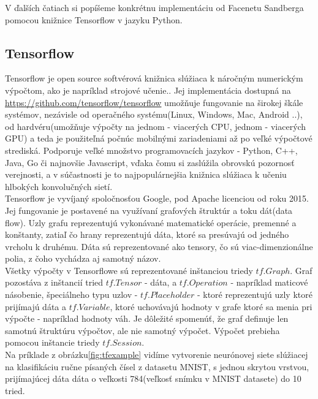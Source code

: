 \indent V ďalších čatiach si popíšeme konkrétnu implementáciu od Facenetu Sandberga \cite{davidsan26} pomocou knižnice Tensorflow v jazyku Python.

\subsection{Tensorflow}
Tensorflow je open source softvérová knižnica slúžiaca k náročným numerickým výpočtom, ako je napríklad strojové učenie.\cite{tensorflow2015}.
Jej implementácia dostupná na \url{https://github.com/tensorflow/tensorflow} umožňuje fungovanie na širokej škále systémov, nezávisle od operačného systému(Linux, Windows, Mac, Android ..), od hardvéru(umožňuje výpočty na jednom - viacerých CPU, jednom - viacerých GPU) a teda je použiteľná počnúc mobilnými zariadeniami až po veľké výpočtové strediská.
Podporuje veľké množstvo programovacích jazykov - Python, C++, Java, Go či najnovšie Javascript, vďaka čomu si zaslúžila obrovskú pozornosť verejnosti, a v súčastnosti je to najpopulárnejšia knižnica slúžiaca k učeniu hlbokých konvolučných sietí.\\

\indent Tensorflow je vyvíjaný spoločnosťou Google, pod Apache licenciou od roku 2015\cite{tensorflow2015}.
Jej fungovanie je postavené na využívaní grafových štruktúr a toku dát(data flow).
Uzly grafu reprezentujú vykonávané matematické operácie, premenné a konštanty, zatiaľ čo hrany reprezentujú dáta, ktoré sa presúvajú od jedného vrcholu k druhému.
Dáta sú reprezentované ako tensory, čo sú viac-dimenzionálne polia, z čoho vychádza aj samotný názov. \\

\indent Všetky výpočty v Tensorflowe sú reprezentované inštanciou triedy $ tf.Graph $. \cite{TensorFl6}
Graf pozostáva z inštancií tried $ tf.Tensor $ - dáta, a $ tf.Operation $ - napríklad maticové násobenie, špeciálneho typu uzlov - $ tf.Placeholder $ - ktoré reprezentujú uzly ktoré prijímajú dáta a $ tf.Variable $, ktoré uchovávajú hodnoty v grafe ktoré sa menia pri výpočte - napríklad hodnoty váh.
Je dôležité spomenúť, že graf definuje len samotnú štruktúru výpočtov, ale nie samotný výpočet.
Výpočet prebieha pomocou inštancie triedy $ tf.Session $. \\

\indent Na príklade z obrázku\ref{fig:tfexample} vidíme vytvorenie neurónovej siete slúžiacej na klasifikáciu ručne písaných čísel z datasetu MNIST, s jednou skrytou vrstvou, prijímajúcej dáta dáta o veľkosti 784(veľkosť snímku v MNIST datasete) do 10 tried.


